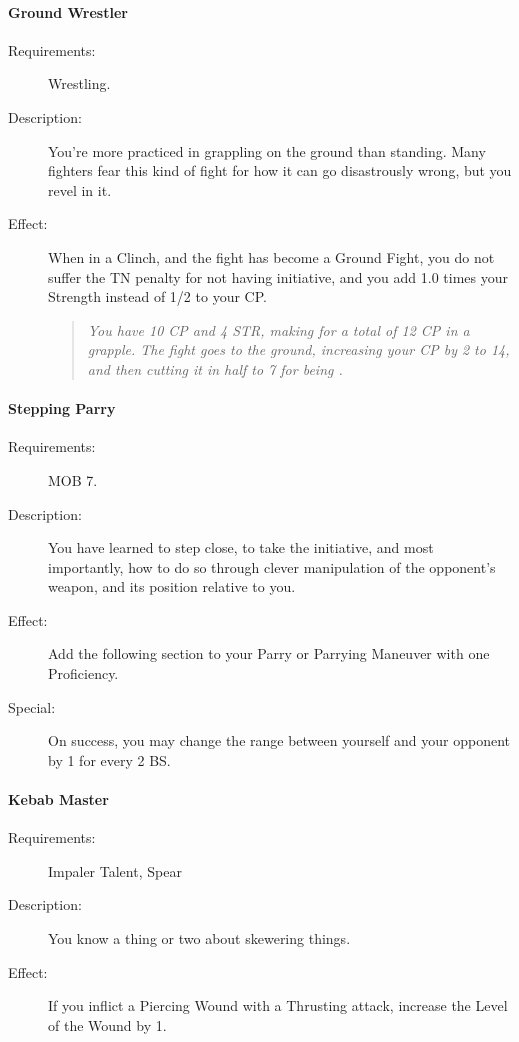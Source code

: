 \documentclass[oneside,11pt,english]{book}
\begin{document}
\paragraph{Ground Wrestler}\label{talent:Ground Wrestler}
\begin{description}
\item [Requirements:] Wrestling. 
\item [Description:] You’re more practiced in grappling on the ground than
  standing. Many fighters fear this kind of fight for how it can go disastrously
  wrong, but you revel in it.   
\item [Effect:] When in a Clinch, and the fight has become a Ground Fight, you
  do not suffer the TN penalty for not having initiative, and you add 1.0 times
  your Strength instead of 1/2 to your CP.
  \begin{quote}
    \emph{You have 10 CP and 4 STR, making for a total of 12 CP in a grapple. The
  fight goes to the ground, increasing your CP by 2 to 14, and then cutting it
  in half to 7 for being .}
\end{quote}
\end{description}
\paragraph{\label{talent:Stepping Parry}Stepping Parry}
\begin{description}
\item [Requirements:] MOB 7. 
\item [Description:] You have learned to step close, to take the initiative, and most importantly, how to do so 
  through clever manipulation of the opponent’s weapon, and its position relative to you. 
\item [Effect:] Add the following section to your Parry or Parrying Maneuver with one Proficiency. 
\item [Special:] On success, you may change the range between yourself and your opponent by 1 for every 2 BS.
  
\end{description}
\paragraph{\label{talent:Kebab Master}Kebab Master}
\begin{description}
\item [Requirements:] Impaler Talent, Spear 
\item [Description:] You know a thing or two about skewering things. 
\item [Effect:] If you inflict a Piercing Wound with a Thrusting attack, increase the Level of the Wound by 1. 
  
\end{description}
\end{document}

